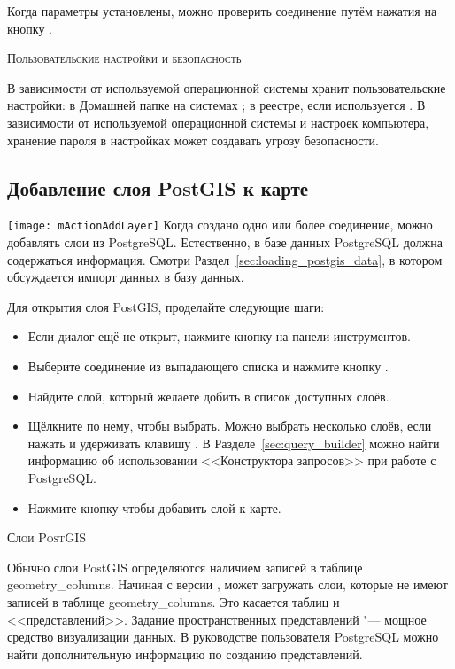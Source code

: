 Когда параметры установлены, можно проверить соединение путём нажатия
на кнопку  .

\begin{Tip}\caption{\textsc{\qg Пользовательские настройки и безопасность}}
В зависимости от используемой операционной системы \qg хранит
пользовательские настройки: в Домашней папке на \nix системах
; в реестре, если используется \win. В зависимости
от используемой операционной системы и настроек компьютера, хранение пароля
в настройках \qg может создавать угрозу безопасности.
\end{Tip}

\subsection{Добавление слоя PostGIS к карте}

\texttt{[image: mActionAddLayer]} Когда создано одно или
более соединение, можно добавлять слои из PostgreSQL. Естественно, в базе
данных PostgreSQL должна содержаться информация. Смотри
Раздел~\ref{sec:loading_postgis_data}, в котором обсуждается импорт данных
в базу данных.

Для открытия слоя PostGIS, проделайте следующие шаги:

\begin{itemize}[label=--]
\item Если диалог  ещё не открыт, нажмите
кнопку  на панели
инструментов.
\item Выберите соединение из выпадающего списка и нажмите кнопку
.
\item Найдите слой, который желаете добить в список доступных слоёв.
\item Щёлкните по нему, чтобы выбрать. Можно выбрать несколько слоёв,
если нажать и удерживать клавишу . В
Разделе~\ref{sec:query_builder} можно найти информацию об использовании
<<Конструктора запросов>> при работе с PostgreSQL.
\item Нажмите кнопку  чтобы добавить слой к карте.
\end{itemize}

\begin{Tip}\caption{\textsc{Слои PostGIS}}
Обычно слои PostGIS определяются наличием записей в таблице
geometry\_columns. Начиная с версии \OLD %
, \qg может загружать слои, которые не имеют записей в таблице
geometry\_columns. Это касается таблиц и <<представлений>>. %
Задание пространственных представлений "--- мощное средство визуализации данных.
В руководстве пользователя PostgreSQL можно найти дополнительную информацию
по созданию представлений.
\end{Tip}


